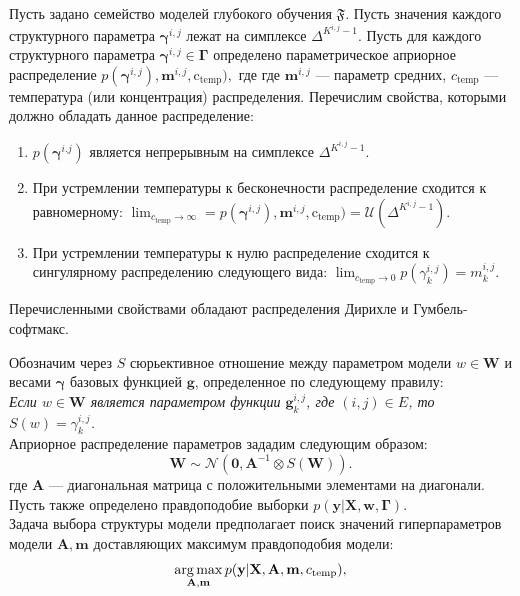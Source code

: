 Пусть задано семейство моделей глубокого обучения $\mathfrak{F}$.
Пусть значения каждого структурного параметра $\boldsymbol{\gamma}^{i,j}$ лежат на симплексе $\Delta^{K^{i,j}-1}$.
Пусть для каждого структурного параметра $\boldsymbol{\gamma}^{i,j} \in \boldsymbol{\Gamma}$ определено параметрическое априорное распределение $p(\boldsymbol{\gamma}^{i,j}), \mathbf{m}^{i,j}, \text{c}_{\text{temp}}),$ где где $\mathbf{m}^{i,j}$ --- параметр средних,  $c_{\text{temp}}$ --- температура (или концентрация) распределения.
Перечислим свойства, которыми должно обладать данное распределение:
\begin{enumerate}
\item $p(\boldsymbol{\gamma}^{i.j})$ является непрерывным на симплексе $\Delta^{K^{i,j}-1}$.
\item При устремлении температуры к бесконечности распределение сходится к равномерному: $\lim_{c_{\text{temp}} \to \infty} = p(\boldsymbol{\gamma}^{i,j}), \mathbf{m}^{i,j}, \text{c}_{\text{temp}}) = \mathcal{U}(\Delta^{K^{i,j}-1}).$
\item При устремлении температуры к нулю распределение сходится к сингулярному распределению следующего вида:
$\lim_{c_{\text{temp}} \to 0}  p(\gamma^{i,j}_k) = m^{i,j}_k.$
\end{enumerate}

\begin{utv}
Перечисленными свойствами обладают распределения Дирихле и Гумбель-софтмакс.
\end{utv}

Обозначим через $S$ сюрьективное отношение между параметром модели $w \in \mathbf{W}$ и весами $\boldsymbol{\gamma}$ базовых функцией $\mathbf{g}$, определенное по следующему правилу:\\
\textit{Если $w \in \mathbf{W}$ является параметром функции $\mathbf{g}^{i,j}_k$, где $(i,j) \in E$, то $S(w) = \gamma^{i,j}_k$.}\\
Априорное распределение параметров  зададим следующим образом:
\[
    \mathbf{W} \sim \mathcal{N}\left(\mathbf{0}, \mathbf{A}^{-1} \otimes S(\mathbf{W})\right).
\]
где $\mathbf{A}$ --- диагональная матрица с положительными элементами на диагонали.
Пусть также определено правдоподобие выборки $p(\mathbf{y}|\mathbf{X}, \mathbf{w}, \boldsymbol{\Gamma}).$\\

Задача выбора структуры модели предполагает поиск значений гиперпараметров модели $\mathbf{A}, \mathbf{m}$ доставляющих максимум правдоподобия модели:
\begin{equation}
\label{eq:evidence_optim}
    \operatorname*{arg\,max}_{\mathbf{A}, \mathbf{m}}  p(\mathbf{y}|\mathbf{X},\mathbf{A},\mathbf{m}, {c_\text{temp}}),
\end{equation}


